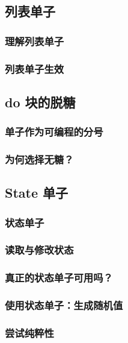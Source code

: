\documentclass[./main.tex]{subfiles}
\begin{document}
\subsection*{列表单子}

\subsubsection*{理解列表单子}

\subsubsection*{列表单子生效}

\subsection*{do 块的脱糖}

\subsubsection*{单子作为可编程的分号}

\subsubsection*{为何选择无糖？}

\subsection*{State 单子}

\subsubsection*{状态单子}

\subsubsection*{读取与修改状态}

\subsubsection*{真正的状态单子可用吗？}

\subsubsection*{使用状态单子：生成随机值}

\subsubsection*{尝试纯粹性}
\end{document}
